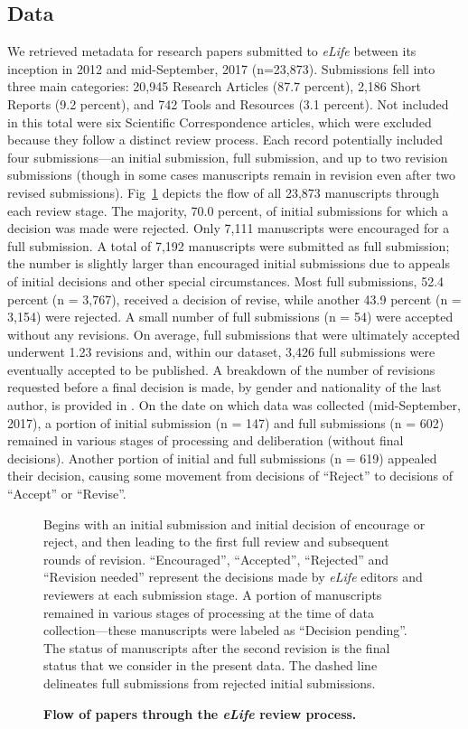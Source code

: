 \documentclass[10pt,letterpaper]{article}
\begin{document}
\subsection*{Data}
We retrieved metadata for research papers submitted to \textit{eLife} between its inception in 2012 and mid-September, 2017 (n=23,873). Submissions fell into three main categories: 20,945 Research Articles (87.7 percent), 2,186 Short Reports (9.2 percent), and 742 Tools and Resources (3.1 percent). Not included in this total were six Scientific Correspondence articles, which were excluded because they follow a distinct review process. Each record potentially included four submissions—an initial submission, full submission, and up to two revision submissions (though in some cases manuscripts remain in revision even after two revised submissions). Fig~\ref{fig1} depicts the flow of all 23,873 manuscripts through each review stage. The majority, 70.0 percent, of initial submissions for which a decision was made were rejected. Only 7,111 manuscripts were encouraged for a full submission. A total of 7,192 manuscripts were submitted as full submission; the number is slightly larger than encouraged initial submissions due to appeals of initial decisions and other special circumstances. Most full submissions, 52.4 percent (n = 3,767), received a decision of revise, while another 43.9 percent (n = 3,154) were rejected. A small number of full submissions (n = 54) were accepted without any revisions. On average, full submissions that were ultimately accepted underwent 1.23 revisions and, within our dataset, 3,426 full submissions were eventually accepted to be published. A breakdown of the number of revisions requested before a final decision is made, by gender and nationality of the last author, is provided in . On the date on which data was collected (mid-September, 2017), a portion of initial submission (n = 147) and full submissions (n = 602) remained in various stages of processing and deliberation (without final decisions). Another portion of initial and full submissions (n = 619) appealed their decision, causing some movement from decisions of “Reject” to decisions of “Accept” or “Revise”.

\begin{figure}[!h]
\caption{\bf Flow of papers through the \textit{eLife} review process.}
Begins with an initial submission and initial decision of encourage or reject, and then leading to the first full review and subsequent rounds of revision. “Encouraged”, “Accepted”, “Rejected” and “Revision needed” represent the decisions made by \textit{eLife} editors and reviewers at each submission stage. A portion of manuscripts remained in various stages of processing at the time of data collection—these manuscripts were labeled as “Decision pending”. The status of manuscripts after the second revision is the final status that we consider in the present data. The dashed line delineates full submissions from rejected initial submissions. 
\label{fig1}
\end{figure}
\end{document}
